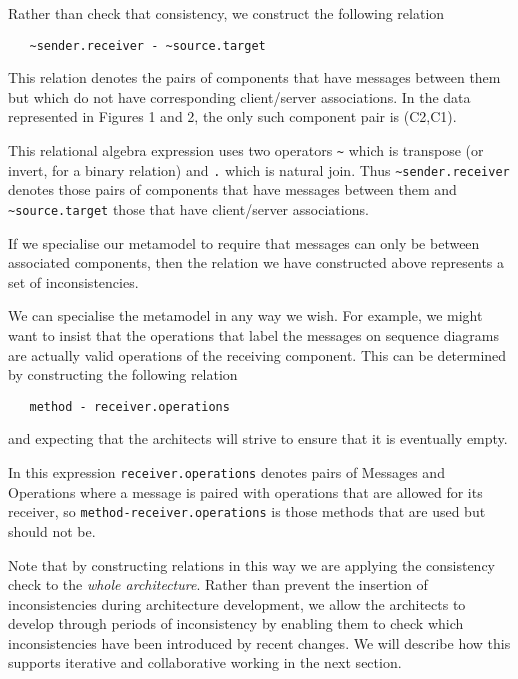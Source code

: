 \documentclass[times, 10pt,twocolumn]{article}
\begin{document}
Rather than check that consistency, we construct the following relation
\begin{small}
\begin{verbatim}
   ~sender.receiver - ~source.target
\end{verbatim}
\end{small}
This relation denotes the pairs of components that have messages between them but which do not have corresponding client/server associations. In the data represented in Figures 1 and 2, the only such component pair is (C2,C1).

This relational algebra expression uses two operators {\small\verb$~$} which is transpose (or invert, for a binary relation) and {\small\verb$.$} which is natural join. Thus {\small\verb$~sender.receiver$} denotes those pairs of components that have messages between them and {\small\verb$~source.target$} those that have client/server associations.

If we specialise our metamodel to require that messages can only be between associated components, then the relation we have constructed above represents a set of inconsistencies. 

We can specialise the metamodel in any way we wish. For example, we might want to insist that the operations that label the messages on sequence diagrams are actually valid operations of the receiving component. This can be determined by constructing the following relation
\begin{small}
\begin{verbatim}
   method - receiver.operations
\end{verbatim}
\end{small}
and expecting that the architects will strive to ensure that it is eventually empty.

In this expression {\small\verb$receiver.operations$} denotes pairs of Messages and Operations where a message is paired with operations that are allowed for its receiver, so 
{\small\verb$method-receiver.operations$} 
is those methods that are used but should not be.

Note that by constructing relations in this way we are applying the consistency check to the {\em whole architecture}. Rather than prevent the insertion of inconsistencies during architecture development, we allow the architects to develop through periods of inconsistency by enabling them to check which inconsistencies have been introduced by recent changes. We will describe how this supports iterative and collaborative working in the next section.
\end{document}
